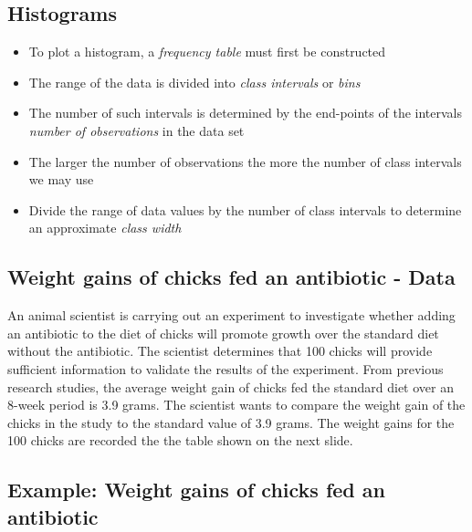\documentclass[
  letterpaper,
  DIV=11,
  numbers=noendperiod]{scrartcl}
\begin{document}
\subsection{Histograms}\label{histograms}

\begin{itemize}
\item
  To plot a histogram, a {\emph{frequency table}} must first be
  constructed
\item
  The range of the data is divided into {\emph{class intervals}} or
  {\emph{bins}}
\item
  The number of such intervals is determined by the end-points of the
  intervals {\emph{number of observations}} in the data set
\item
  The larger the number of observations the more the number of class
  intervals we may use
\item
  Divide the range of data values by the number of class intervals to
  determine an approximate {\emph{class width}}
\end{itemize}

\subsection{Weight gains of chicks fed an antibiotic -
Data}\label{weight-gains-of-chicks-fed-an-antibiotic---data}

An animal scientist is carrying out an experiment to investigate whether
adding an antibiotic to the diet of chicks will promote growth over the
standard diet without the antibiotic. The scientist determines that 100
chicks will provide sufficient information to validate the results of
the experiment. From previous research studies, the average weight gain
of chicks fed the standard diet over an 8-week period is 3.9 grams. The
scientist wants to compare the weight gain of the chicks in the study to
the standard value of 3.9 grams. The weight gains for the 100 chicks are
recorded the the table shown on the next slide.

\subsection{Example: Weight gains of chicks fed an
antibiotic}\label{example-weight-gains-of-chicks-fed-an-antibiotic}
\end{document}
